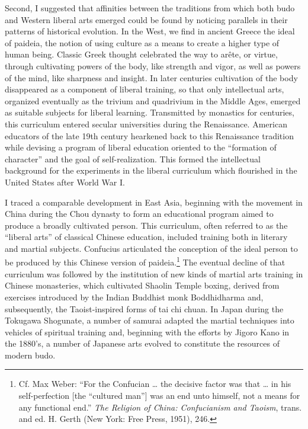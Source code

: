 Second, I suggested that affinities between the traditions from which both budo and Western liberal arts emerged could be found by noticing parallels in their patterns of historical evolution. In the West, we find in ancient Greece the ideal of paideia, the notion of using culture as a means to create a higher type of human being. Classic Greek thought celebrated the way to ar\^{e}te, or virtue, through cultivating powers of the body, like strength and vigor, as well as powers of the mind, like sharpness and insight. In later centuries cultivation of the body disappeared as a component of liberal training, so that only intellectual arts, organized eventually as the trivium and quadrivium in the Middle Ages, emerged as suitable subjects for liberal learning. Transmitted by monastics for centuries, this curriculum entered secular universities during the Renaissance. American educators of the late 19th century hearkened back to this Renaissance tradition while devising a program of liberal education oriented to the ``formation of character'' and the goal of self-realization. This formed the intellectual background for the experiments in the liberal curriculum which flourished in the United States after World War I.

I traced a comparable development in East Asia, beginning with the movement in China during the Chou dynasty to form an educational program aimed to produce a broadly cultivated person. This curriculum, often referred to as the ``liberal arts'' of classical Chinese education, included training both in literary and martial subjects. Confucius articulated the conception of the ideal person to be produced by this Chinese version of paideia.\footnote{Cf. Max Weber: ``For the Confucian \ldots{} the decisive factor was that \ldots{} in his self-perfection [the ``cultured man''] was an end unto himself, not a means for any functional end.'' \emph{The Religion of China: Confucianism and Taoism}, trans. and ed. H. Gerth (New York: Free Press, 1951), 246.} The eventual decline of that curriculum was followed by the institution of new kinds of martial arts training in Chinese monasteries, which cultivated Shaolin Temple boxing, derived from exercises introduced by the Indian Buddhist monk Boddhidharma and, subsequently, the Taoist-inspired forms of tai chi chuan. In Japan during the Tokugawa Shogunate, a number of samurai adapted the martial techniques into vehicles of spiritual training and, beginning with the efforts by Jigoro Kano in the 1880's, a number of Japanese arts evolved to constitute the resources of modern budo. 

